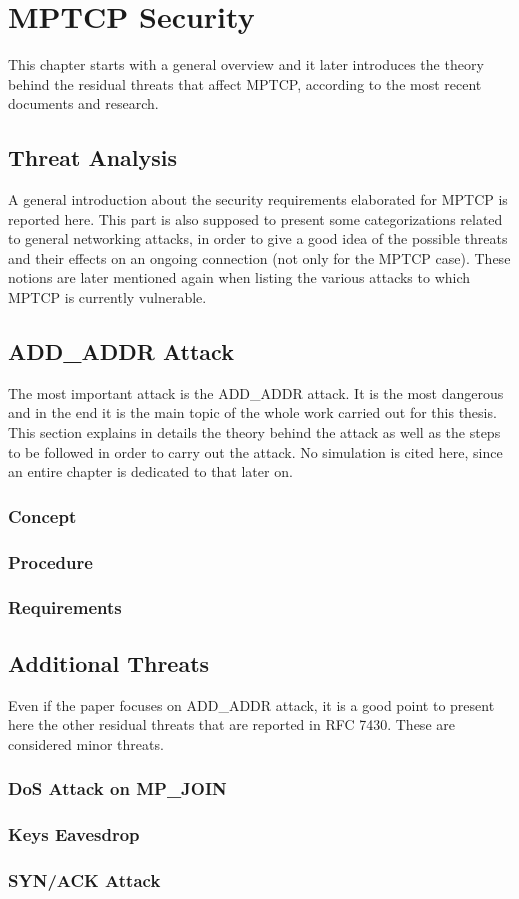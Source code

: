 \chapter{MPTCP Security}
\label{chap:mptcpsecurity}

This chapter starts with a general overview and it later introduces the theory behind the residual threats that affect MPTCP, according to the most recent documents and research.

\section{Threat Analysis}
A general introduction about the security requirements elaborated for MPTCP is reported here. This part is also supposed to present some categorizations related to general networking attacks, in order to give a good idea of the possible threats and their effects on an ongoing connection (not only for the MPTCP case). These notions are later mentioned again when listing the various attacks to which MPTCP is currently vulnerable.

\section{ADD\_ADDR Attack} \label{theaddaddrattack}
The most important attack is the ADD\_ADDR attack. It is the most dangerous and in the end it is the main topic of the whole work carried out for this thesis. This section explains in details the theory behind the attack as well as the steps to be followed in order to carry out the attack. No simulation is cited here, since an entire chapter is dedicated to that later on.

\subsection{Concept}
\subsection{Procedure}
\subsection{Requirements}


\section{Additional Threats}
Even if the paper focuses on ADD\_ADDR attack, it is a good point to present here the other residual threats that are reported in RFC 7430. These are considered minor threats.

\subsection{DoS Attack on MP\_JOIN}
\subsection{Keys Eavesdrop}
\subsection{SYN/ACK Attack}